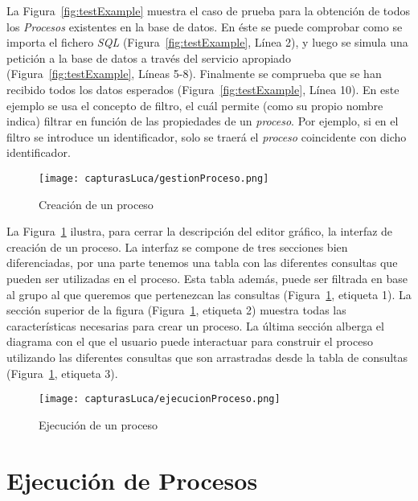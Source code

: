 La Figura~\ref{fig:testExample} muestra el caso de prueba para la obtención de todos los \emph{Procesos} existentes en la base de datos. En éste se puede comprobar como se importa el fichero \emph{SQL} (Figura~\ref{fig:testExample}, Línea 2), y luego se simula una petición a la base de datos a través del servicio apropiado (Figura~\ref{fig:testExample}, Líneas 5-8). Finalmente se comprueba que se han recibido todos los datos esperados (Figura~\ref{fig:testExample}, Línea 10). En este ejemplo se usa el concepto de filtro, el cuál permite (como su propio nombre indica) filtrar en función de las propiedades de un \emph{proceso}. Por ejemplo, si en el filtro se introduce un identificador, solo se traerá el \emph{proceso} coincidente con dicho identificador.

\begin{figure}[H]
	\centering
	\texttt{[image: capturasLuca/gestionProceso.png]}
	\caption{Creación de un proceso}
	\label{fig:gestionProceso}
\end{figure}

La Figura~\ref{fig:gestionProceso} ilustra, para cerrar la descripción del editor gráfico, la interfaz de creación de un proceso. La interfaz se compone de tres secciones bien diferenciadas, por una parte tenemos una tabla con las diferentes consultas que pueden ser utilizadas en el proceso. Esta tabla además, puede ser filtrada en base al grupo al que queremos que pertenezcan las consultas (Figura~\ref{fig:gestionProceso}, etiqueta 1). La sección superior de la figura (Figura~\ref{fig:gestionProceso}, etiqueta 2) muestra todas las características necesarias para crear un proceso. La última sección alberga el diagrama con el que el usuario puede interactuar para construir el proceso utilizando las diferentes consultas que son arrastradas desde la tabla de consultas (Figura~\ref{fig:gestionProceso}, etiqueta 3).

\begin{figure}[H]
	\centering
	\texttt{[image: capturasLuca/ejecucionProceso.png]}
	\caption{Ejecución de un proceso}
	\label{fig:ejecucionProceso}
\end{figure}

\section{Ejecución de Procesos}



